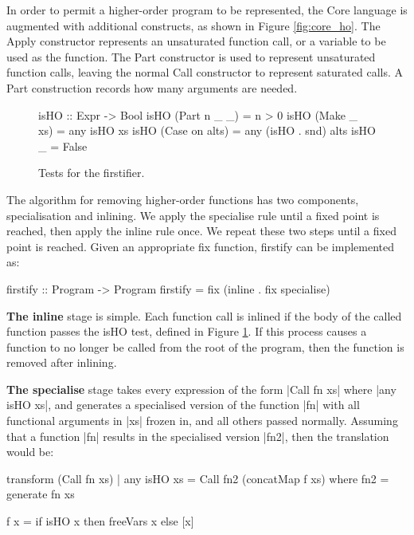 \documentclass[preprint]{sigplanconf}
\newcommand{\C}[1]{\textsf{#1}}
\newcommand{\para}[1]{\vspace{2mm}\noindent\textbf{#1}}
\begin{document}
In order to permit a higher-order program to be represented, the Core language is augmented with additional constructs, as shown in Figure \ref{fig:core_ho}. The \C{Apply} constructor represents an unsaturated function call, or a variable to be used as the function. The \C{Part} constructor is used to represent unsaturated function calls, leaving the normal \C{Call} constructor to represent saturated calls. A \C{Part} construction records how many arguments are needed.

\begin{figure}
\begin{code}
isHO :: Expr -> Bool
isHO (Part n _ _)    = n > 0
isHO (Make _ xs)     = any isHO xs
isHO (Case on alts)  = any (isHO . snd) alts
isHO _               = False
\end{code}
\caption{Tests for the firstifier.}
\label{fig:isHO}
\end{figure}

The algorithm for removing higher-order functions has two components, specialisation and inlining. We apply the specialise rule until a fixed point is reached, then apply the inline rule once. We repeat these two steps until a fixed point is reached. Given an appropriate \C{fix} function, \C{firstify} can be implemented as:

\begin{code}
firstify :: Program -> Program
firstify = fix (inline . fix specialise)
\end{code}

\para{The \C{inline}} stage is simple. Each function call is inlined if the body of the called function passes the \C{isHO} test, defined in Figure \ref{fig:isHO}. If this process causes a function to no longer be called from the root of the program, then the function is removed after inlining.

\para{The \C{specialise}} stage takes every expression of the form |Call fn xs| where |any isHO xs|, and generates a specialised version of the function |fn| with all functional arguments in |xs| frozen in, and all others passed normally. Assuming that a function |fn| results in the specialised version |fn2|, then the translation would be:

\begin{code}
transform (Call fn xs) | any isHO xs =
    Call fn2 (concatMap f xs)
    where
    fn2 = generate fn xs

    f x = if isHO x then freeVars x else [x]
\end{code}
\end{document}
